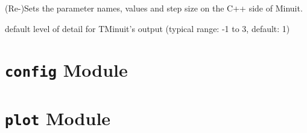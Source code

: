 \documentclass[a4paper,10pt,english]{sphinxmanual}
\begin{document}
\begin{fulllineitems}
\begin{fulllineitems}
\end{fulllineitems}


\begin{fulllineitems}
\label{index:kafe.minuit.Minuit.update_parameter_data}
(Re-)Sets the parameter names, values and step size on the
C++ side of Minuit.

\end{fulllineitems}


\end{fulllineitems}


\begin{fulllineitems}
\label{index:kafe.minuit.P_DETAIL_LEVEL}
default level of detail for TMinuit's output
(typical range: -1 to 3, default: 1)

\end{fulllineitems}



\section{\texttt{config} Module}
\label{index:module-kafe.config}\label{index:config-module}\label{index:module-config}

\section{\texttt{plot} Module}
\label{index:module-kafe.plot}\label{index:plot-module}\label{index:module-plot}
\end{document}

